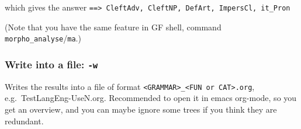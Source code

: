 which gives the answer
\texttt{==\textgreater{}\ CleftAdv,\ CleftNP,\ DefArt,\ ImpersCl,\ it\_Pron}

(Note that you have the same feature in GF shell, command
\texttt{morpho\_analyse}/\texttt{ma}.)

\hypertarget{write-into-a-file--w}{%
\subsubsection{\texorpdfstring{Write into a file:
\texttt{-w}}{Write into a file: -w}}\label{write-into-a-file--w}}

Writes the results into a file of format
\texttt{\textless{}GRAMMAR\textgreater{}\_\textless{}FUN\ or\ CAT\textgreater{}.org},
e.g.~TestLangEng-UseN.org. Recommended to open it in emacs org-mode, so
you get an overview, and you can maybe ignore some trees if you think
they are redundant.

